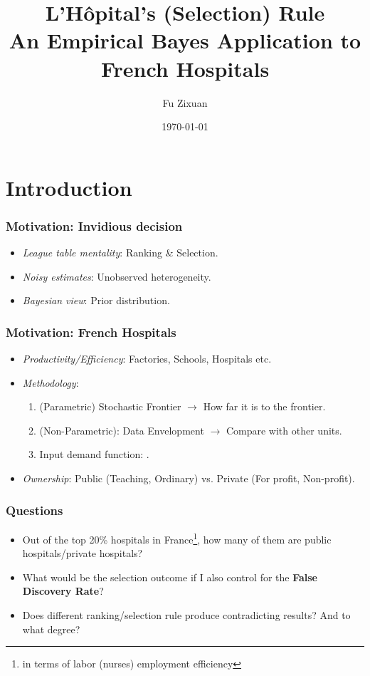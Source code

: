 \documentclass[10pt,mathserif,aspectratio=169]{beamer}
\title{\large \bfseries L'Hôpital's (Selection) Rule\\
An Empirical Bayes Application to French Hospitals}
\author{Fu Zixuan\\[3ex]
}
\date{\today}
\begin{document}
\frame{
  \thispagestyle{empty}
  \titlepage
}

\section{Introduction}

\begin{frame}
  \frametitle{Motivation: Invidious decision}
  \begin{itemize}\itemsep=12pt
    \item \textit{League table mentality}: Ranking \& Selection.
    \item \textit{Noisy estimates}: Unobserved heterogeneity.
    \item \textit{Bayesian view}: Prior distribution.
  \end{itemize}
\end{frame}

\begin{frame}
  \frametitle{Motivation: French Hospitals}
  \begin{itemize}\itemsep=12pt
    \item \textit{Productivity/Efficiency}: Factories, Schools, Hospitals etc.
    \item \textit{Methodology}:
          \begin{enumerate} \vspace*{0.5em} \itemsep=8pt
            \item (Parametric) Stochastic Frontier \cite{aigner1977formulation,meeusen1977efficiency}$\to$ How far it is to the frontier.
            \item (Non-Parametric): Data Envelopment \cite{charnes1978measuring}$\to$ Compare with other units.
            \item Input demand function: \cite{croiset2024hospitals}.
          \end{enumerate}
    \item \textit{Ownership}: Public (Teaching, Ordinary) vs. Private (For profit, Non-profit).
  \end{itemize}
\end{frame}

\begin{frame}
  \frametitle{Questions}
  \begin{itemize}\itemsep=12pt
    \item Out of the top 20\% hospitals in France\footnote{in terms of labor (nurses)
            employment efficiency}, how many of them are public hospitals/private
          hospitals?
    \item What would be the selection outcome if I also control for the \textbf{False
            Discovery Rate}?
    \item Does different ranking/selection rule produce contradicting results? And to
          what degree?
  \end{itemize}
\end{frame}
\end{document}
